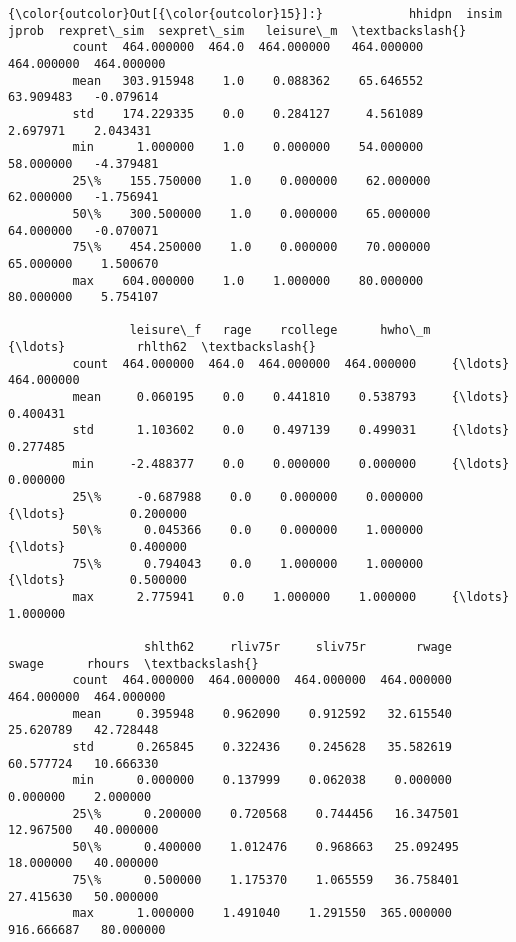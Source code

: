 \documentclass[11pt]{article}
\begin{document}
\begin{Verbatim}[commandchars=\\\{\}]
{\color{outcolor}Out[{\color{outcolor}15}]:}            hhidpn  insim       jprob  rexpret\_sim  sexpret\_sim   leisure\_m  \textbackslash{}
         count  464.000000  464.0  464.000000   464.000000   464.000000  464.000000   
         mean   303.915948    1.0    0.088362    65.646552    63.909483   -0.079614   
         std    174.229335    0.0    0.284127     4.561089     2.697971    2.043431   
         min      1.000000    1.0    0.000000    54.000000    58.000000   -4.379481   
         25\%    155.750000    1.0    0.000000    62.000000    62.000000   -1.756941   
         50\%    300.500000    1.0    0.000000    65.000000    64.000000   -0.070071   
         75\%    454.250000    1.0    0.000000    70.000000    65.000000    1.500670   
         max    604.000000    1.0    1.000000    80.000000    80.000000    5.754107   
         
                 leisure\_f   rage    rcollege      hwho\_m     {\ldots}          rhlth62  \textbackslash{}
         count  464.000000  464.0  464.000000  464.000000     {\ldots}       464.000000   
         mean     0.060195    0.0    0.441810    0.538793     {\ldots}         0.400431   
         std      1.103602    0.0    0.497139    0.499031     {\ldots}         0.277485   
         min     -2.488377    0.0    0.000000    0.000000     {\ldots}         0.000000   
         25\%     -0.687988    0.0    0.000000    0.000000     {\ldots}         0.200000   
         50\%      0.045366    0.0    0.000000    1.000000     {\ldots}         0.400000   
         75\%      0.794043    0.0    1.000000    1.000000     {\ldots}         0.500000   
         max      2.775941    0.0    1.000000    1.000000     {\ldots}         1.000000   
         
                   shlth62     rliv75r     sliv75r       rwage       swage      rhours  \textbackslash{}
         count  464.000000  464.000000  464.000000  464.000000  464.000000  464.000000   
         mean     0.395948    0.962090    0.912592   32.615540   25.620789   42.728448   
         std      0.265845    0.322436    0.245628   35.582619   60.577724   10.666330   
         min      0.000000    0.137999    0.062038    0.000000    0.000000    2.000000   
         25\%      0.200000    0.720568    0.744456   16.347501   12.967500   40.000000   
         50\%      0.400000    1.012476    0.968663   25.092495   18.000000   40.000000   
         75\%      0.500000    1.175370    1.065559   36.758401   27.415630   50.000000   
         max      1.000000    1.491040    1.291550  365.000000  916.666687   80.000000   
         

\end{Verbatim}
\end{document}
